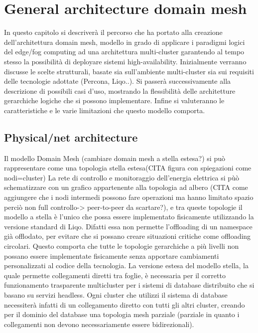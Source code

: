 \chapter{General architecture domain mesh}
In questo capitolo si descriverà il percorso che ha portato alla creazione dell'architettura domain mesh, modello in grado di applicare i paradigmi logici del edge/fog computing ad una architettura multi-cluster garantendo al tempo stesso la possibilità di deployare sistemi high-availability. Inizialmente verranno discusse le scelte strutturali, basate sia sull'ambiente multi-cluster sia sui requisiti delle tecnologie adottate (Percona, Liqo..). Si passerà successivamente alla descrizione di possibili casi d'uso, mostrando la flessibilità delle architetture gerarchiche logiche che si possono implementare. Infine si valuteranno le caratteristiche e le varie limitazioni che questo modello comporta. 

\section{Physical/net architecture}
Il modello Domain Mesh (cambiare domain mesh a stella estesa?) si può rappresentare come una topologia stella estesa(CITA figura con spiegazioni come nodi=cluster)
La rete di controllo e monitoraggio dell'energia elettrica si pùò schematizzare con un grafico appartenente alla topologia ad albero (CITA come aggiungere che i nodi intermedi possono fare operazioni ma hanno limitato spazio perciò non full controllo-> peer-to-peer da scartare?), e tra queste topologie il modello a stella è l'unico che possa essere implementato fisicamente utilizzando la versione standard di Liqo. Difatti essa non permette l'offloading di un namespace già offlodato, per evitare che si possano creare situazioni critiche come offloading circolari. Questo comporta che tutte le topologie gerarchiche a più livelli non possano essere implementate fisicamente senza apportare cambiamenti personalizzati al codice della tecnologia.
La versione estesa del modello stella, la quale permette collegamenti diretti tra foglie, è necessaria per il corretto funzionamento trasparente multicluster per i sistemi di database distribuito che si basano su servizi headless. Ogni cluster che utilizzi il sistema di database necessiterà infatti di un collegamento diretto con tutti gli altri cluster, creando per il dominio del database una topologia mesh parziale (parziale in quanto i collegamenti non devono necessariamente essere bidirezionali).

